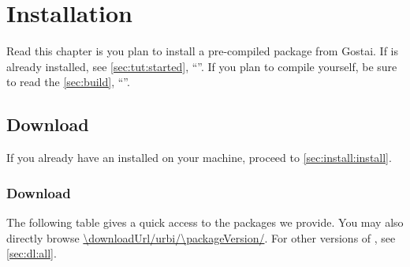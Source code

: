 
\chapter{Installation}
\label{sec:installation}

Read this chapter is you plan to install a pre-compiled package from Gostai.
If \urbi is already installed, see \autoref{sec:tut:started},
``''.  If you plan to compile \urbi yourself, be
sure to read the \autoref{sec:build}, ``''.

\section{Download}

If you already have an \urbi installed on your machine, proceed to
\autoref{sec:install:install}.

\subsection{Download \urbi \packageVersion}
\label{sec:dl:latest}

The following table gives a quick access to the packages we provide.  You
may also directly browse \url{\downloadUrl/urbi/\packageVersion/}.  For
other versions of \usdk, see \autoref{sec:dl:all}.

